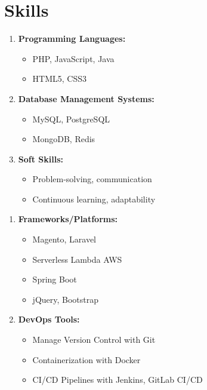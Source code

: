 \documentclass[letterpaper,11pt]{article}
\begin{document}
\section{Skills}
  \vspace{3pt}
  \small
    \begin{minipage}[t]{0.5\textwidth}
    \begin{enumerate}[label=•]
      \item \textbf{Programming Languages:}
      \begin{itemize}[label=-, topsep=-1.5pt]
        \item PHP, JavaScript, Java
        \item HTML5, CSS3
      \end{itemize}
      \item \textbf{Database Management Systems:}
      \begin{itemize}[label=-, topsep=-1.5pt]
        \item MySQL, PostgreSQL
        \item MongoDB, Redis
      \end{itemize}
      \item \textbf{Soft Skills:}
      \begin{itemize}[label=-, topsep=-1.5pt]
        \item Problem-solving, communication
        \item Continuous learning, adaptability
      \end{itemize}
    \end{enumerate}
    \end{minipage}%
    \hfill
    \begin{minipage}[t]{0.5\textwidth}
    \begin{enumerate}[label=•]
      \item \textbf{Frameworks/Platforms:}
      \begin{itemize}[label=-, topsep=-1.5pt]
        \item Magento, Laravel
        \item Serverless Lambda AWS
        \item Spring Boot
        \item jQuery, Bootstrap
      \end{itemize}
      \item \textbf{DevOps Tools:}
      \begin{itemize}[label=-, topsep=-1.5pt]
        \item Manage Version Control with Git
        \item Containerization with Docker
        \item CI/CD Pipelines with Jenkins, GitLab CI/CD
      \end{itemize}
    \end{enumerate}
    \end{minipage}%
\end{document}
